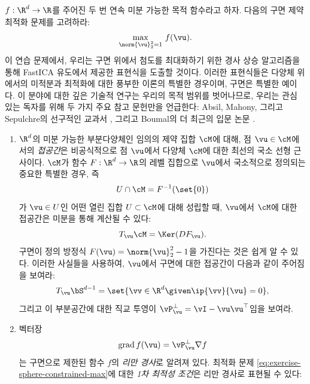 \documentclass[../../book-main_ko.tex]{subfiles}
\begin{document}
\begin{exercise}\label{exercise:sphere-calculus}
    $f : \R^d \to \R$를 주어진 두 번 연속 미분 가능한 목적 함수라고 하자. 다음의 구면 제약 최적화 문제를 고려하라:
    \begin{equation}\label{eq:exercise-sphere-constrained-max}
        \max_{\norm{\vu}_2^2 = 1}\, f(\vu).
    \end{equation}
    이 연습 문제에서, 우리는 구면 위에서 첨도를 최대화하기 위한 경사 상승 알고리즘을 통해 FastICA 유도에서 제공한 표현식을 도출할 것이다. 이러한 표현식들은 다양체 위에서의 미적분과 최적화에 대한 풍부한 이론의 특별한 경우이며, 구면은 특별한 예이다. 이 분야에 대한 깊은 기술적 연구는 우리의 목적 범위를 벗어나므로, 우리는 관심 있는 독자를 위해 두 가지 주요 참고 문헌만을 언급한다: Absil, Mahony, 그리고 Sepulchre의 선구적인 교과서 \cite{Absil2009-nc}, 그리고 Boumal의 더 최근의 입문 논문 \cite{Boumal2023-rj}.
    \begin{enumerate}
        \item $\R^d$의 미분 가능한 부분다양체인 임의의 제약 집합 $\cM$에 대해, 점 $\vu \in \cM$에서의 \textit{접공간}은 비공식적으로 점 $\vu$에서 다양체 $\cM$에 대한 최선의 국소 선형 근사이다. $\cM$가 함수 $F : \R^d \to \R$의 레벨 집합으로 $\vu$에서 국소적으로 정의되는 중요한 특별한 경우, 즉
        \begin{equation*}
            U \cap \cM = F^{-1}(\set{0})
        \end{equation*}
        가 $\vu \in U$인 어떤 열린 집합 $U \subset \cM$에 대해 성립할 때, $\vu$에서 $\cM$에 대한 접공간은 미분을 통해 계산될 수 있다:
        \begin{equation*}
            T_{\vu} \cM = \Ker(DF_{\vu}).
        \end{equation*}
        구면이 정의 방정식 $F(\vu) = \norm{\vu}_2^2 - 1$을 가진다는 것은 쉽게 알 수 있다. 이러한 사실들을 사용하여, $\vu$에서 구면에 대한 접공간이 다음과 같이 주어짐을 보여라:
        \begin{equation*}
            T_{\vu} \bS^{d-1} = \set{\vv \in \R^d \given \ip{\vv}{\vu} = 0},
        \end{equation*}
        그리고 이 부분공간에 대한 직교 투영이 $\vP_{\vu}^\perp = \vI - \vu\vu^\top$임을 보여라.
        \item 벡터장
        \begin{equation}\label{eq:exercise-riemann-grad-sphere}
        \mathrm{grad}\, f(\vu) = \vP_{\vu}^\perp \nabla f
        \end{equation}
        는 구면으로 제한된 함수 $f$의 \textit{리만 경사}로 알려져 있다. 최적화 문제 \eqref{eq:exercise-sphere-constrained-max}에 대한 \textit{1차 최적성 조건}은 리만 경사로 표현될 수 있다:

\end{enumerate}
\end{exercise}
\end{document}

